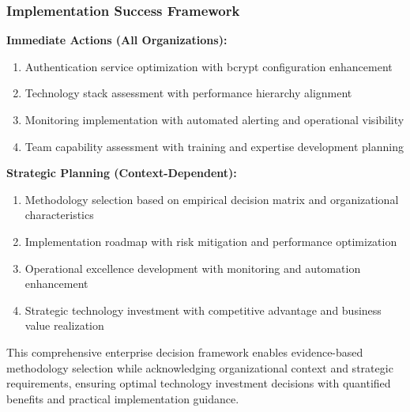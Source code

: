 \subsubsection{Implementation Success Framework}

\textbf{Immediate Actions (All Organizations):}
\begin{enumerate}
\item Authentication service optimization with bcrypt configuration enhancement
\item Technology stack assessment with performance hierarchy alignment
\item Monitoring implementation with automated alerting and operational visibility
\item Team capability assessment with training and expertise development planning
\end{enumerate}

\textbf{Strategic Planning (Context-Dependent):}
\begin{enumerate}
\item Methodology selection based on empirical decision matrix and organizational characteristics
\item Implementation roadmap with risk mitigation and performance optimization
\item Operational excellence development with monitoring and automation enhancement
\item Strategic technology investment with competitive advantage and business value realization
\end{enumerate}

This comprehensive enterprise decision framework enables evidence-based methodology selection while acknowledging organizational context and strategic requirements, ensuring optimal technology investment decisions with quantified benefits and practical implementation guidance.